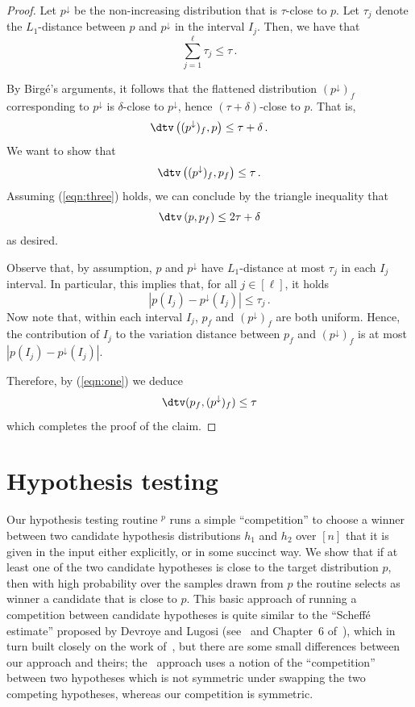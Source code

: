\begin{proof}
Let $p^{\downarrow}$ be the non-increasing distribution that is $\tau$-close to $p$.
Let $\tau_j$ denote the $L_1$-distance between $p$ and $p^{\downarrow}$ in the interval $I_j$.
Then, we have that
\begin{equation} \label{eqn:one}
\sum_{j=1}^{\ell} \tau_j \leq \tau\,.
\end{equation}

By Birg{\'e}'s arguments, it follows that the flattened distribution $(p^{\downarrow})_f$
corresponding to $p^{\downarrow}$ is $\delta$-close to $p^{\downarrow}$,
hence $(\tau+\delta)$-close to $p$. That is,
\begin{equation} \label{eqn:two}
\dtv \left( (p^{\downarrow})_f, p \right)  \leq \tau+\delta\,.
\end{equation}
We want to show that
\begin{equation} \label{eqn:three}
\dtv \left( (p^{\downarrow})_f, p_f \right) \leq \tau\,.
\end{equation}
Assuming (\ref{eqn:three}) holds, we can conclude by the triangle inequality that
$$\dtv \left(p, p_f \right) \leq 2\tau+\delta$$
as desired.

Observe that, by assumption, $p$ and $p^{\downarrow}$ have
$L_1$-distance at most $\tau_j$ in each $I_j$ interval.
In particular, this implies that, for all $j \in [\ell]$, it holds
$$ \left| p(I_j) - p^{\downarrow}(I_j) \right| \leq \tau_j\,.$$
Now note that, within each interval $I_j$, $p_f$ and $(p^{\downarrow})_f$ are both uniform.
Hence, the contribution of $I_j$ to the variation distance between  $p_f$ and $(p^{\downarrow})_f$
is at most $|p(I_j) - p^{\downarrow}(I_j)|$.

Therefore, by (\ref{eqn:one}) we deduce
$$\dtv (p_f , (p^{\downarrow})_f ) \leq \tau$$
which completes the proof of the claim.
\end{proof}

\section{Hypothesis testing} \label{sec:choosehypothesis}

Our hypothesis testing routine $^p$ runs a simple ``competition'' to choose a winner between two candidate hypothesis distributions $h_1$ and $h_2$  over $[n]$ that it is given in the input either explicitly, or in some succinct way.  We show that if at least one of the two candidate hypotheses is close to the target distribution $p$, then with high probability over the samples drawn from $p$ the routine selects as winner a candidate that is close to $p$.
  This basic approach of running a competition between candidate hypotheses is quite similar to the ``Scheff\'e estimate'' proposed by Devroye and Lugosi (see~\cite{DL96,DL97}
and Chapter~6 of~\cite{DL:01}), which in turn built closely on the work of~\cite{Yatracos85}, but
there are some small differences between our approach and theirs; the~\cite{DL:01} approach uses a notion of the ``competition'' between two hypotheses which is not symmetric under swapping the two competing hypotheses, whereas our competition is {symmetric}.
%


